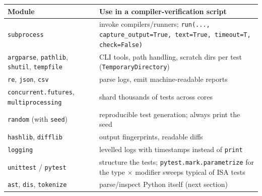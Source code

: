 \documentclass[10pt,a4paper,openany,oneside]{report}
\begin{document}
\begin{center}\small
\begin{xltabular}{\textwidth}{@{}L{3.6cm}Y@{}}
\toprule
\textbf{Module} & \textbf{Use in a compiler-verification script}\\
\midrule\endhead
\texttt{subprocess} & invoke compilers/runners; \texttt{run(..., capture\_output=True, text=True, timeout=T, check=False)}\\
\texttt{argparse}, \texttt{pathlib}, \texttt{shutil}, \texttt{tempfile} & CLI tools, path handling, scratch dirs per test (\texttt{TemporaryDirectory})\\
\texttt{re}, \texttt{json}, \texttt{csv} & parse logs, emit machine-readable reports\\
\texttt{concurrent.futures}, \texttt{multiprocessing} & shard thousands of tests across cores\\
\texttt{random} (with \texttt{seed}) & reproducible test generation; always print the seed\\
\texttt{hashlib}, \texttt{difflib} & output fingerprints, readable diffs\\
\texttt{logging} & levelled logs with timestamps instead of \texttt{print}\\
\texttt{unittest} / \texttt{pytest} & structure the tests; \texttt{pytest.mark.parametrize} for the type $\times$ modifier sweeps typical of ISA tests\\
\texttt{ast}, \texttt{dis}, \texttt{tokenize} & parse/inspect Python itself (next section)\\
\bottomrule
\end{xltabular}
\end{center}
\end{document}
